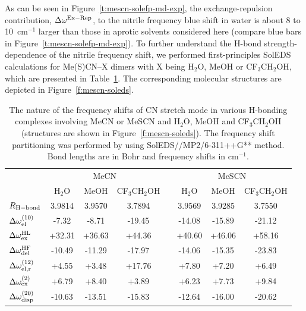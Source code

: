 \documentclass[a4paper,titlepage,twoside,fleqn,12pt]{book}
\begin{document}
\begin{refsection}
As can be seen in Figure~\ref{t:mescn-solefp-md-exp}, the exchange\hyp{}repulsion
contribution, $\Delta\omega^{\rm Ex-Rep}$, to the nitrile frequency blue shift in
water is about 8 to 10~cm$^{-1}$ larger than those in aprotic
solvents considered here (compare blue bars in Figure~\ref{t:mescn-solefp-md-exp}). To
further understand the H-bond strength\hyp{}dependence of the
nitrile frequency shift, we performed first\hyp{}principles SolEDS
calculations for Me(S)CN--X dimers with X being H$_2$O, MeOH or
CF$_3$CH$_2$OH, which are presented in Table~\ref{t:mescn-soleds}. 
The corresponding molecular structures are depicted in Figure~\ref{f:mescn-soleds}. 
%
\begin{table}[t!]
\caption{
The nature of the frequency shifts of CN stretch mode in various 
H-bonding complexes involving MeCN or MeSCN and H$_2$O, MeOH 
and CF$_3$CH$_2$OH (structures are shown in Figure~\ref{f:mescn-soleds}). 
The frequency shift partitioning was performed by using 
SolEDS//MP2/6-311++G** method. Bond lengths are in Bohr and frequency shifts in
cm$^{-1}$.
\label{t:mescn-soleds}}
\begin{tabular*}{1.0\textwidth}{@{\extracolsep{\fill} } l ccc c ccc}
\hline\hline
                                 & \multicolumn{3}{c}{MeCN}            && \multicolumn{3}{c}{MeSCN}             \\
                                 & H$_2$O &    MeOH  &  CF$_3$CH$_2$OH &&  H$_2$O   &  MeOH   &  CF$_3$CH$_2$OH \\
\hline
$R_{\rm H-bond}$                 & 3.9814 &   3.9570 &  3.7894         &&  3.9569   &  3.9285 &    3.7550       \\ 
$\Delta\omega^{(10)}_{\rm el}$   & -7.32  &    -8.71 &     -19.45      &&  -14.08   &  -15.89 &    -21.12       \\
$\Delta\omega^{\rm HL}_{\rm ex}$ & +32.31 &   +36.63 &     +44.36      &&  +40.60   &  +46.06 &    +58.16       \\
$\Delta\omega^{\rm HF}_{\rm del}$& -10.49 &   -11.29 &     -17.97      &&  -14.06   &  -15.35 &    -23.83       \\
$\Delta\omega^{(12)}_{\rm el,r}$ &  +4.55 &    +3.48 &     +17.76      &&   +7.80   &   +7.20 &     +6.49       \\
$\Delta\omega^{(2)}_{\rm ex}$    &  +6.79 &    +8.40 &      +3.89      &&   +6.23   &   +7.73 &     +9.84       \\
$\Delta\omega^{(20)}_{\rm disp}$ & -10.63 &   -13.51 &     -15.83      &&  -12.64   &  -16.00 &    -20.62       \\

\end{tabular*}
\end{table}
\end{refsection}
\end{document}
